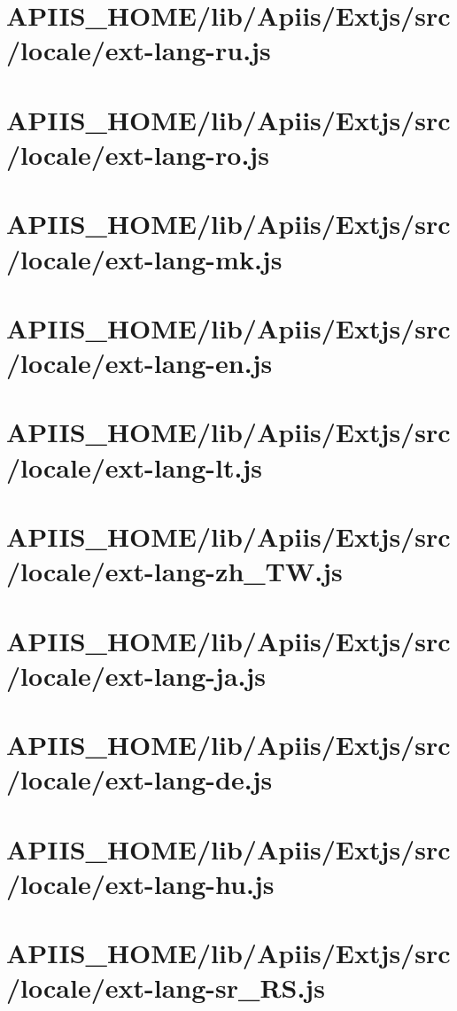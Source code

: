 \section{APIIS\_HOME/lib/Apiis/Extjs/src/locale/ext-lang-ru.js} 
\section{APIIS\_HOME/lib/Apiis/Extjs/src/locale/ext-lang-ro.js} 
\section{APIIS\_HOME/lib/Apiis/Extjs/src/locale/ext-lang-mk.js} 
\section{APIIS\_HOME/lib/Apiis/Extjs/src/locale/ext-lang-en.js} 
\section{APIIS\_HOME/lib/Apiis/Extjs/src/locale/ext-lang-lt.js} 
\section{APIIS\_HOME/lib/Apiis/Extjs/src/locale/ext-lang-zh\_TW.js} 
\section{APIIS\_HOME/lib/Apiis/Extjs/src/locale/ext-lang-ja.js} 
\section{APIIS\_HOME/lib/Apiis/Extjs/src/locale/ext-lang-de.js} 
\section{APIIS\_HOME/lib/Apiis/Extjs/src/locale/ext-lang-hu.js} 
\section{APIIS\_HOME/lib/Apiis/Extjs/src/locale/ext-lang-sr\_RS.js} 
